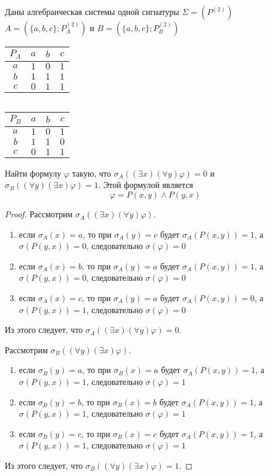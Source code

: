 \documentclass[12pt]{article}
\begin{document}
Даны алгебраическая системы одной сигнатуры $\Sigma = (P^{(2)})$ $A=(\{a,b,c\};P_A^{(2)})$ и $B=(\{a,b,c\};P_B^{(2)})$

\begin{table}[h]
\begin{tabular}{|c|c|c|c|}
\hline 
$P_A$ & $a$ & $b$ & $c$ \\ 
\hline 
$a$ & $1$ & $0$ & $1$ \\ 
\hline 
$b$ & $1$ & $1$ & $1$ \\ 
\hline 
$c$ & $0$ & $1$ & $1$ \\ 
\hline 
\end{tabular}$\quad$ 
\begin{tabular}{|c|c|c|c|}
\hline 
$P_B$ & $a$ & $b$ & $c$ \\ 
\hline 
$a$ & $1$ & $0$ & $1$ \\ 
\hline 
$b$ & $1$ & $1$ & $0$ \\ 
\hline 
$c$ & $0$ & $1$ & $1$ \\ 
\hline 
\end{tabular} 
\end{table}
Найти формулу $\varphi$ такую, что $\sigma_A((\exists x)(\forall y)\varphi)=0$ и $\sigma_B((\forall y)(\exists x)\varphi)=1$. Этой формулой является
$$\varphi = P(x,y)\wedge P(y,x)$$
\begin{proof}
Рассмотрим $\sigma_A((\exists x)(\forall y)\varphi)$.
\begin{enumerate}
\item если $\sigma_A(x)=a$, то при $\sigma_A(y)=c$ будет $\sigma_A(P(x,y))=1$, а $\sigma(P(y,x))=0$, следовательно $\sigma(\varphi)=0$
\item если $\sigma_A(x)=b$, то при $\sigma_A(y)=a$ будет $\sigma_A(P(x,y))=1$, а $\sigma(P(y,x))=0$, следовательно $\sigma(\varphi)=0$
\item если $\sigma_A(x)=c$, то при $\sigma_A(y)=a$ будет $\sigma_A(P(x,y))=0$, а $\sigma(P(y,x))=1$, следовательно $\sigma(\varphi)=0$
\end{enumerate}
Из этого следует,  что $\sigma_A((\exists x)(\forall y)\varphi)=0$.

Рассмотрим $\sigma_B((\forall y)(\exists x)\varphi)$.
\begin{enumerate}
\item если $\sigma_B(y)=a$, то при $\sigma_B(x)=a$ будет $\sigma_A(P(x,y))=1$, а $\sigma(P(y,x))=1$, следовательно $\sigma(\varphi)=1$
\item если $\sigma_B(y)=b$, то при $\sigma_B(x)=b$ будет $\sigma_A(P(x,y))=1$, а $\sigma(P(y,x))=1$, следовательно $\sigma(\varphi)=1$
\item если $\sigma_B(y)=c$, то при $\sigma_B(x)=c$ будет $\sigma_A(P(x,y))=1$, а $\sigma(P(y,x))=1$, следовательно $\sigma(\varphi)=1$
\end{enumerate}
Из этого следует,  что $\sigma_B((\forall y)(\exists x)\varphi)=1$.
\end{proof}
\end{document}
